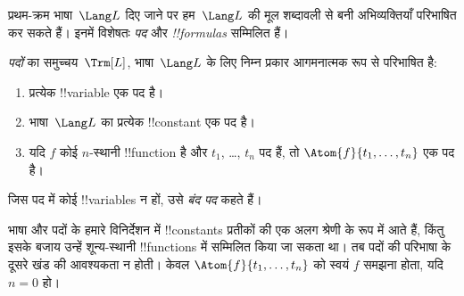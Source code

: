 \documentclass[../../../include/open-logic-section]{subfiles}
\begin{document}


प्रथम-क्रम भाषा~$\Lang L$ दिए जाने पर हम~$\Lang L$ की मूल शब्दावली से बनी
अभिव्यक्तियाँ परिभाषित कर सकते हैं। इनमें विशेषतः \emph{पद} और
\emph{!!{formula}s} सम्मिलित हैं।

\begin{defn}[पद]
\emph{पदों} का समुच्चय~$\Trm[L]$, भाषा~$\Lang L$ के लिए निम्न प्रकार
आगमनात्मक रूप से परिभाषित है:
\begin{enumerate}
\item प्रत्येक !!{variable} एक पद है।
\item भाषा~$\Lang L$ का प्रत्येक !!{constant} एक पद है।
\item यदि $f$ कोई $n$-स्थानी !!{function} है और $t_1$, \dots, $t_n$
  पद हैं, तो $\Atom{f}{t_1, \ldots, t_n}$ एक पद है।
\end{enumerate}
जिस पद में कोई !!{variable}s न हों, उसे \emph{बंद पद} कहते हैं।
\end{defn}

\begin{explain}
भाषा और पदों के हमारे विनिर्देशन में !!{constant}s प्रतीकों की एक अलग
श्रेणी के रूप में आते हैं, किंतु इसके बजाय उन्हें शून्य-स्थानी
!!{function}s में सम्मिलित किया जा सकता था। तब पदों की परिभाषा के दूसरे
खंड की आवश्यकता न होती। केवल $\Atom{f}{t_1, \ldots, t_n}$ को स्वयं $f$
समझना होता, यदि $n =
0$ हो।
\end{explain}
\end{document}
